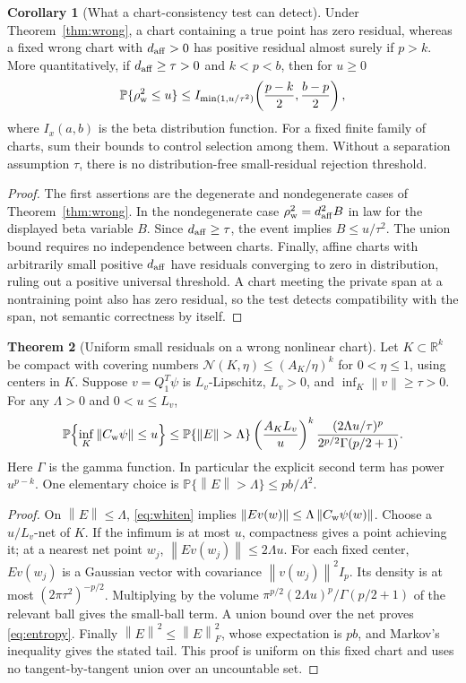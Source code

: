 \documentclass[11pt,a4paper]{article}
\theoremstyle{definition}
\newtheorem{theorem}{Theorem}[section]
\newtheorem{corollary}[theorem]{Corollary}
\theoremstyle{definition}
\theoremstyle{remark}\newtheorem{remark}[theorem]{Remark}
\newcommand{\R}{\mathbb R}\newcommand{\Prob}{\mathbb P}\newcommand{\E}{\mathbb E}
\newcommand{\norm}[1]{\left\lVert #1\right\rVert}
\begin{document}
\begin{corollary}[What a chart-consistency test can detect]\label{cor:test}
Under Theorem~\ref{thm:wrong}, a chart containing a true point has zero residual, whereas a fixed wrong chart with $d_{\rm aff}>0$ has positive residual almost surely if $p>k$. More quantitatively, if $d_{\rm aff}\ge\tau>0$ and $k<p<b$, then for $u\ge0$
\[
\Prob\{\rho_{\rm w}^2\le u\}
\le I_{\min(1,u/\tau^2)}\!\left(\frac{p-k}{2},\frac{b-p}{2}\right),
\]
where $I_x(a,b)$ is the beta distribution function. For a fixed finite family of charts, sum their bounds to control selection among them. Without a separation assumption $\tau$, there is no distribution-free small-residual rejection threshold.
\end{corollary}
\begin{proof}
The first assertions are the degenerate and nondegenerate cases of Theorem~\ref{thm:wrong}. In the nondegenerate case $\rho_{\rm w}^2=d_{\rm aff}^2B$ in law for the displayed beta variable $B$. Since $d_{\rm aff}\ge\tau$, the event implies $B\le u/\tau^2$. The union bound requires no independence between charts. Finally, affine charts with arbitrarily small positive $d_{\rm aff}$ have residuals converging to zero in distribution, ruling out a positive universal threshold. A chart meeting the private span at a nontraining point also has zero residual, so the test detects compatibility with the span, not semantic correctness by itself.
\end{proof}

\begin{theorem}[Uniform small residuals on a wrong nonlinear chart]\label{thm:entropy}
Let $K\subset\R^k$ be compact with covering numbers $\mathcal N(K,\eta)\le(A_K/\eta)^k$ for $0<\eta\le1$, using centers in $K$. Suppose $v=Q_1^T\psi$ is $L_v$-Lipschitz, $L_v>0$, and $\inf_K\norm{v}\ge\tau>0$. For any $\Lambda>0$ and $0<u\le L_v$,
\begin{equation}\label{eq:entropy}
\Prob\!\left\{\inf_K\norm{C_{\rm w}\psi}\le u\right\}
\le \Prob\{\norm E>\Lambda\}
\left(\frac{A_KL_v}{u}\right)^k
\frac{(2\Lambda u/\tau)^p}{2^{p/2}\Gamma(p/2+1)}.
\end{equation}
Here $\Gamma$ is the gamma function. In particular the explicit second term has power $u^{p-k}$. One elementary choice is $\Prob\{\norm E>\Lambda\}\le pb/\Lambda^2$.
\end{theorem}
\begin{proof}
On $\norm E\le\Lambda$, \eqref{eq:whiten} implies $\norm{Ev(w)}\le\Lambda\norm{C_{\rm w}\psi(w)}$. Choose a $u/L_v$-net of $K$. If the infimum is at most $u$, compactness gives a point achieving it; at a nearest net point $w_j$, $\norm{Ev(w_j)}\le2\Lambda u$. For each fixed center, $Ev(w_j)$ is a Gaussian vector with covariance $\norm{v(w_j)}^2I_p$. Its density is at most $(2\pi\tau^2)^{-p/2}$. Multiplying by the volume $\pi^{p/2}(2\Lambda u)^p/\Gamma(p/2+1)$ of the relevant ball gives the small-ball term. A union bound over the net proves \eqref{eq:entropy}. Finally $\norm E^2\le\norm E_F^2$, whose expectation is $pb$, and Markov's inequality gives the stated tail. This proof is uniform on this fixed chart and uses no tangent-by-tangent union over an uncountable set.
\end{proof}
\end{document}
